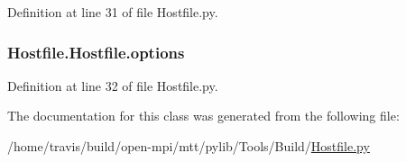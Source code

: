 Definition at line 31 of file Hostfile.\-py.

\hypertarget{class_hostfile_1_1_hostfile_a3b460597c8d5a628c265573aa532a568}{
\subsubsection[{options}]{\setlength{\rightskip}{0pt plus 5cm}Hostfile.\-Hostfile.\-options}}\label{class_hostfile_1_1_hostfile_a3b460597c8d5a628c265573aa532a568}


Definition at line 32 of file Hostfile.\-py.



The documentation for this class was generated from the following file\-:\begin{DoxyCompactItemize}
\item 
/home/travis/build/open-\/mpi/mtt/pylib/\-Tools/\-Build/\hyperlink{_hostfile_8py}{Hostfile.\-py}\end{DoxyCompactItemize}
